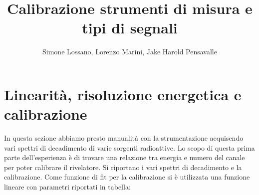 \documentclass[a4paper]{article}
\title{Calibrazione strumenti di misura e tipi di segnali}
\author{Simone Lossano, Lorenzo Marini, Jake Harold Pensavalle}
\begin{document}
	\maketitle
	\newpage
	\tableofcontents
	\newpage
\section{Linearità, risoluzione energetica e calibrazione}
In questa sezione abbiamo presto manualità con la strumentazione acquisendo vari spettri di decadimento di varie sorgenti radioattive. Lo scopo di questa prima parte dell'esperienza è di trovare una relazione tra energia e numero del canale per poter calibrare il rivelatore. 
Si riportano i vari spettri di decadimento e la calibrazione. Come funzione di fit per la calibrazione si è utilizzata una funzione lineare con parametri riportati in tabella:
\end{document}
